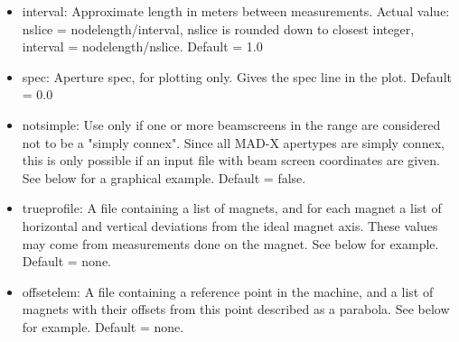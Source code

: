 \begin{itemize}
\begin{itemize}
	\item interval: Approximate length in meters between measurements. Actual value:  nslice = nodelength/interval, nslice is rounded down to closest integer,  interval = nodelength/nslice. Default = 1.0 
	\item spec: Aperture spec, for plotting only. Gives the spec line in the plot. Default = 0.0 
	\item notsimple: Use only if one or more beamscreens in the range are considered not to  be a "simply connex". Since all MAD-X apertypes are simply connex, this is only possible  if an input file with beam screen coordinates are given. See below for a graphical example. Default = false. 
	\item trueprofile: A file containing a list of magnets, and for each magnet a list of horizontal and vertical deviations from the ideal magnet axis. These values may come from measurements done on the magnet. See below for example. Default = none. 
	\item offsetelem: A file containing a reference point in the machine, and a list of magnets with their offsets from this point described as a parabola. See below for example. Default = none. 
\end{itemize}




\end{itemize}
